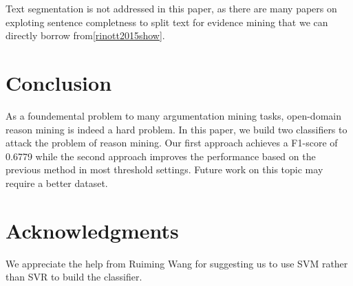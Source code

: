\documentclass[11pt,a4paper]{article}
\begin{document}
Text segmentation is not addressed in this paper, as there are many papers on exploting sentence completness to split text for evidence mining that we can directly borrow from\ref{rinott2015show}.

\section{Conclusion}
\label{sec:conclusion}

As a foundemental problem to many argumentation mining tasks, open-domain reason mining is indeed a hard problem. In this paper, we build two classifiers to attack the problem of reason mining. Our first approach achieves a F1-score of 0.6779 while the second approach improves the performance based on the previous method in most threshold settings. Future work on this topic may require a better dataset.

\section*{Acknowledgments}

We appreciate the help from Ruiming Wang for suggesting us to use SVM rather than SVR to build the classifier. 

% 
%


\end{document}
